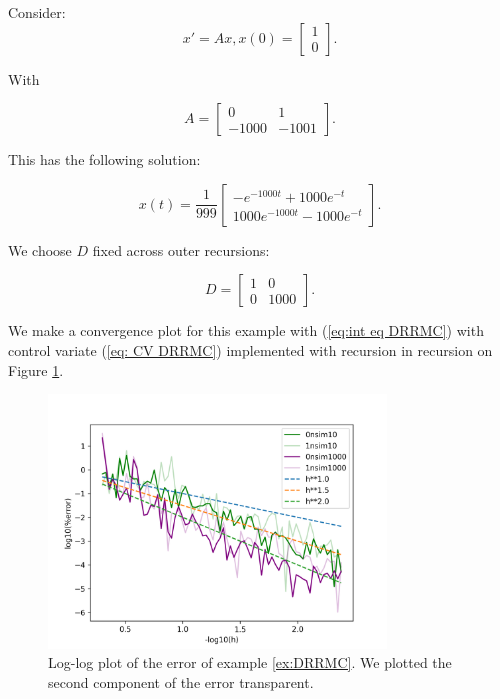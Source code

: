 \documentclass[a4paper,12pt]{article}
\begin{document}
\begin{example}[DRRMC] \label{ex:DRRMC}
    Consider:
    \begin{equation}
        x'= Ax, x(0)=
        \begin{bmatrix}
            1 \\
            0
        \end{bmatrix}.
    \end{equation}

    With

    \begin{equation}
        A = \begin{bmatrix}
            0     & 1     \\
            -1000 & -1001
        \end{bmatrix}.
    \end{equation}

    This has the following solution:

    \begin{equation}
        x(t) = \frac{1}{999}
        \begin{bmatrix}
            -  e^{-1000t}+ 1000 e^{-t} \\
            1000 e^{-1000t}- 1000e^{-t}
        \end{bmatrix}.
    \end{equation}

    We choose $D$ fixed across outer recursions:

    \begin{equation}
        D = \begin{bmatrix}
            1 & 0    \\
            0 & 1000
        \end{bmatrix}.
    \end{equation}

    We make a convergence plot for this example with
    (\ref{eq:int eq DRRMC}) with control variate
    (\ref{eq: CV DRRMC}) implemented with recursion in recursion
    on Figure \ref{fig:DRRMC}.

    \begin{figure}[h!]
        \centering
        \includegraphics[width=0.8\textwidth]{plots/DRRMC.png}
        \caption{Log-log plot of the error of example \ref{ex:DRRMC}.
            We plotted the second component of the error transparent.
        }
        \label{fig:DRRMC}
    \end{figure}


\end{example}
\end{document}
